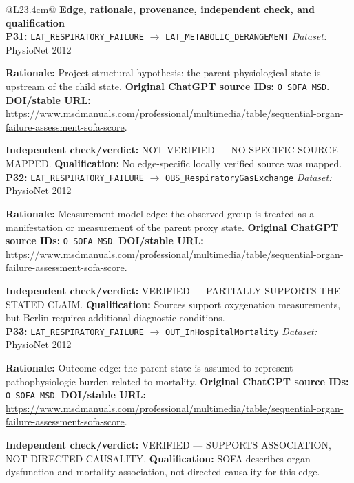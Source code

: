 \begin{tabular}{@{}L{23.4cm}@{}}
\toprule
\textbf{Edge, rationale, provenance, independent check, and qualification}\\
\midrule
\textbf{P31:} \nolinkurl{LAT_RESPIRATORY_FAILURE} $\rightarrow$ \nolinkurl{LAT_METABOLIC_DERANGEMENT} \hfill \textit{Dataset:} PhysioNet 2012\par\textbf{Rationale:} Project structural hypothesis: the parent physiological state is upstream of the child state. \textbf{Original ChatGPT source IDs:} \nolinkurl{O_SOFA_MSD}. \textbf{DOI/stable URL:} \url{https://www.msdmanuals.com/professional/multimedia/table/sequential-organ-failure-assessment-sofa-score}.\par\textbf{Independent check/verdict:} NOT VERIFIED --- NO SPECIFIC SOURCE MAPPED. \textbf{Qualification:} No edge-specific locally verified source was mapped. \\
\addlinespace[2pt]
\midrule
\textbf{P32:} \nolinkurl{LAT_RESPIRATORY_FAILURE} $\rightarrow$ \nolinkurl{OBS_RespiratoryGasExchange} \hfill \textit{Dataset:} PhysioNet 2012\par\textbf{Rationale:} Measurement-model edge: the observed group is treated as a manifestation or measurement of the parent proxy state. \textbf{Original ChatGPT source IDs:} \nolinkurl{O_SOFA_MSD}. \textbf{DOI/stable URL:} \url{https://www.msdmanuals.com/professional/multimedia/table/sequential-organ-failure-assessment-sofa-score}.\par\textbf{Independent check/verdict:} VERIFIED --- PARTIALLY SUPPORTS THE STATED CLAIM. \textbf{Qualification:} Sources support oxygenation measurements, but Berlin requires additional diagnostic conditions. \\
\addlinespace[2pt]
\midrule
\textbf{P33:} \nolinkurl{LAT_RESPIRATORY_FAILURE} $\rightarrow$ \nolinkurl{OUT_InHospitalMortality} \hfill \textit{Dataset:} PhysioNet 2012\par\textbf{Rationale:} Outcome edge: the parent state is assumed to represent pathophysiologic burden related to mortality. \textbf{Original ChatGPT source IDs:} \nolinkurl{O_SOFA_MSD}. \textbf{DOI/stable URL:} \url{https://www.msdmanuals.com/professional/multimedia/table/sequential-organ-failure-assessment-sofa-score}.\par\textbf{Independent check/verdict:} VERIFIED --- SUPPORTS ASSOCIATION, NOT DIRECTED CAUSALITY. \textbf{Qualification:} SOFA describes organ dysfunction and mortality association, not directed causality for this edge. \\

\end{tabular}
